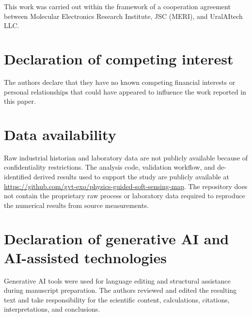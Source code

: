 \documentclass[11pt]{article}
\begin{document}
This work was carried out within the framework of a cooperation agreement between Molecular Electronics Research Institute, JSC (MERI), and UralAItech LLC.

\section*{Declaration of competing interest}

The authors declare that they have no known competing financial interests or personal relationships that could have appeared to influence the work reported in this paper.

\section*{Data availability}

Raw industrial historian and laboratory data are not publicly available because of confidentiality restrictions. The analysis code, validation workflow, and de-identified derived results used to support the study are publicly available at \url{https://github.com/gvt-exo/physics-guided-soft-sensing-map}. The repository does not contain the proprietary raw process or laboratory data required to reproduce the numerical results from source measurements.

\section*{Declaration of generative AI and AI-assisted technologies}

Generative AI tools were used for language editing and structural assistance during manuscript preparation. The authors reviewed and edited the resulting text and take responsibility for the scientific content, calculations, citations, interpretations, and conclusions.



\end{document}
